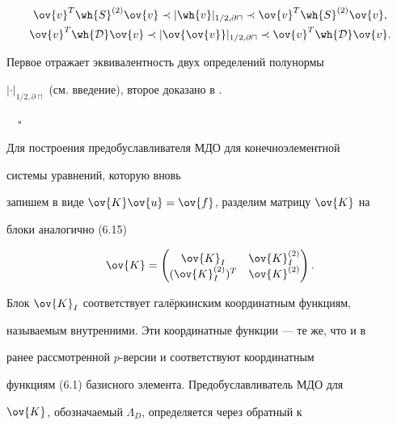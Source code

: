 \begin{gather}\label{eq6.19}


\ov{v}^T \wh{S}^{(2)} \ov{v} \prec


|\wh{v}|_{1/2,\partial\sqcap} \prec \ov{v}^T\wh{S}^{(2)}\ov{v}, \\


%


\label{eq6.20}


\ov{v}^T\wh{{\cal D}} \ov{v} \prec


|\ov{\ov{v}}|_{1/2,\partial\sqcap} \prec 


\ov{v}^T \wh{{\cal D}} \ov{v}.


\end{gather}


Первое отражает эквивалентность двух определений полунормы 


$|\cdot|_{1/2,\partial\sqcap}$ (см. введение), второе доказано в \cite{dryja}.


$\quad\square$


\medskip





Для построения предобуславливателя МДО для конечноэлементной 


системы уравнений, которую вновь 


запишем в виде $\ov{K}\ov{u} = \ov{f}$, разделим матрицу $\ov{K}$ на 


блоки аналогично (6.15)


$$


\ov{K} =


\begin{pmatrix}


\ov{K}_I & \ov{K}^{(2)}_I\\


(\ov{K}^{(2)}_I)^T & \ov{K}^{(2)}


\end{pmatrix}


.


$$


Блок $\ov{K}_I$ соответствует гал\"еркинским координатным функциям, 


называемым внутренними. Эти координатные функции --- те же, что и в 


ранее рассмотренной $p$-версии и соответствуют координатным 


функциям (6.1) базисного элемента. Предобуславливатель МДО для 


$\ov{K}$, обозначаемый $\Lambda_D$, определяется через обратный к 


